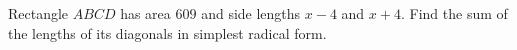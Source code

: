 Rectangle $ABCD$ has area $609$ and side lengths $x-4$ and $x+4$. Find the sum of the lengths of its diagonals in simplest radical form.
